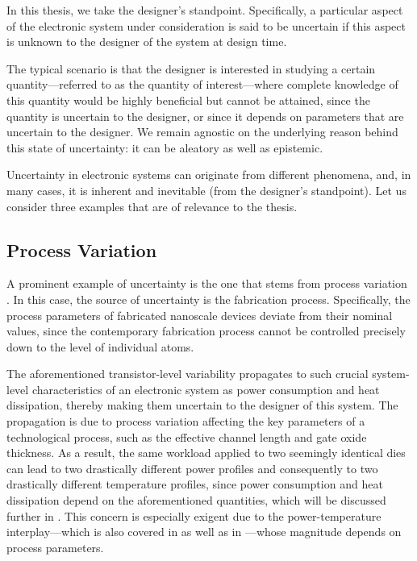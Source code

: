 In this thesis, we take the designer's standpoint. Specifically, a particular
aspect of the electronic system under consideration is said to be uncertain if
this aspect is unknown to the designer of the system at design time.

The typical scenario is that the designer is interested in studying a certain
quantity---referred to as the quantity of interest---where complete knowledge of
this quantity would be highly beneficial but cannot be attained, since the
quantity \perse is uncertain to the designer, or since it depends on parameters
that are uncertain to the designer. We remain agnostic on the underlying reason
behind this state of uncertainty: it can be aleatory as well as epistemic.

Uncertainty in electronic systems can originate from different phenomena, and,
in many cases, it is inherent and inevitable (from the designer's standpoint).
Let us consider three examples that are of relevance to the thesis.

\subsection{Process Variation}

A prominent example of uncertainty is the one that stems from process variation
\cite{chandrakasan2000, srivastava2010}. In this case, the source of uncertainty
is the fabrication process. Specifically, the process parameters of fabricated
nanoscale devices deviate from their nominal values, since the contemporary
fabrication process cannot be controlled precisely down to the level of
individual atoms.

The aforementioned transistor-level variability propagates to such crucial
system-level characteristics of an electronic system as power consumption and
heat dissipation, thereby making them uncertain to the designer of this system.
The propagation is due to process variation affecting the key parameters of a
technological process, such as the effective channel length and gate oxide
thickness. As a result, the same workload applied to two seemingly identical
dies can lead to two drastically different power profiles and consequently to
two drastically different temperature profiles, since power consumption and heat
dissipation depend on the aforementioned quantities, which will be discussed
further in . This concern is especially exigent due to the
power-temperature interplay---which is also covered in  as
well as in ---whose magnitude depends on process
parameters.

